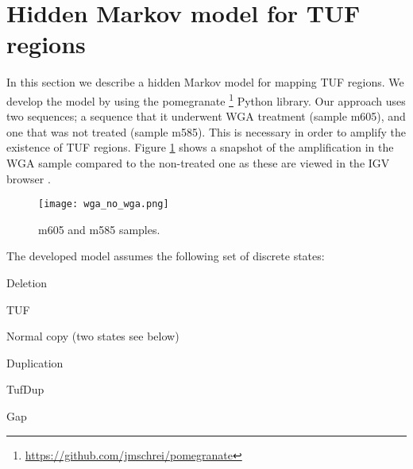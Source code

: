 \documentclass[12pt]{article}
\let\tempone\itemize
\let\temptwo\enditemize
\renewenvironment{itemize}{\tempone\setlength{\itemsep}{0pt}}{\temptwo}
\begin{document}


\section{Hidden Markov model for TUF regions} %
\label{hmm_tuf}

In this section we describe a hidden Markov  model for mapping TUF regions.
We develop the model by using the pomegranate \footnote{\url{https://github.com/jmschrei/pomegranate}} Python library.
Our approach uses two sequences; a sequence that it underwent WGA treatment (sample  m605), and  one that was not treated (sample m585). This is necessary in order to amplify the existence of TUF regions.  
Figure \ref{wga_no_wga } shows a snapshot of the amplification in the WGA sample compared to  the non-treated one as these are viewed in the IGV browser \cite{2011Robinson}.

\begin{figure}[!htb]
	\begin{center}
		\texttt{[image: wga\_no\_wga.png]}
	\end{center}
	\caption{m605 and m585 samples.}
	\label{wga_no_wga }
\end{figure}

The developed model assumes the following set of discrete states:

\begin{itemize}
	\item Deletion
	\item TUF
	\item Normal copy (two states see below)
	\item Duplication
	\item TufDup
	\item Gap
\end{itemize}
\end{document}
